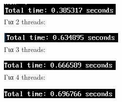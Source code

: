 \documentclass{article}
\begin{document}
\includegraphics[width=\textwidth]{res/run4.png} \\

Για 2 threads:

\includegraphics[width=\textwidth]{res/run5.png} \\

Για 3 threads:

\includegraphics[width=\textwidth]{res/run6.png} \\

Για 4 threads:

\includegraphics[width=\textwidth]{res/run7.png} \\
\end{document}
